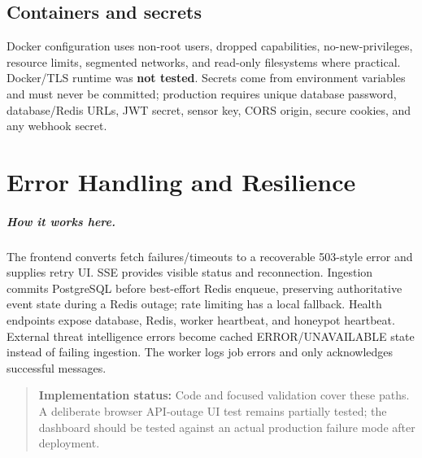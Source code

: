 \documentclass[11pt,oneside]{book}
\newcommand{\how}[1]{\paragraph{How it works here.}#1}
\newcommand{\statusnote}[1]{\begin{quote}\colorbox{hplight}{\parbox{0.92\linewidth}{\textbf{Implementation status:} #1}}\end{quote}}
\begin{document}
\section{Containers and secrets}Docker configuration uses non-root users, dropped capabilities, no-new-privileges, resource limits, segmented networks, and read-only filesystems where practical. Docker/TLS runtime was \textbf{not tested}. Secrets come from environment variables and must never be committed; production requires unique database password, database/Redis URLs, JWT secret, sensor key, CORS origin, secure cookies, and any webhook secret.

\chapter{Error Handling and Resilience}
\how{The frontend converts fetch failures/timeouts to a recoverable 503-style error and supplies retry UI. SSE provides visible status and reconnection. Ingestion commits PostgreSQL before best-effort Redis enqueue, preserving authoritative event state during a Redis outage; rate limiting has a local fallback. Health endpoints expose database, Redis, worker heartbeat, and honeypot heartbeat. External threat intelligence errors become cached ERROR/UNAVAILABLE state instead of failing ingestion. The worker logs job errors and only acknowledges successful messages.}
\statusnote{Code and focused validation cover these paths. A deliberate browser API-outage UI test remains partially tested; the dashboard should be tested against an actual production failure mode after deployment.}
\end{document}
